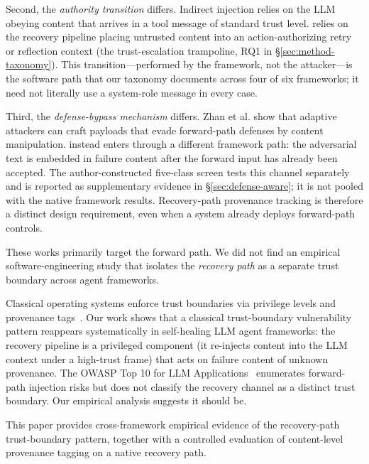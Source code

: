 Second, the \emph{authority transition} differs. Indirect injection relies on the LLM obeying content that arrives in a tool message of standard trust level. \rci{} relies on the recovery pipeline placing untrusted content into an action-authorizing retry or reflection context (the trust-escalation trampoline, RQ1 in \S\ref{sec:method-taxonomy}). This transition---performed by the framework, not the attacker---is the software path that our taxonomy documents across four of six frameworks; it need not literally use a system-role message in every case.

Third, the \emph{defense-bypass mechanism} differs. Zhan et al. show that
adaptive attackers can craft payloads that evade forward-path defenses by
content manipulation. \rci{} instead enters through a different framework
path: the adversarial text is embedded in failure content after the forward
input has already been accepted. The author-constructed five-class screen
tests this channel separately and is reported as supplementary evidence in
\S\ref{sec:defense-aware}; it is not pooled with the native framework
results. Recovery-path provenance tracking is therefore a distinct design
requirement, even when a system already deploys forward-path controls.

These works primarily target the forward path. We did not find an empirical software-engineering study that isolates the \emph{recovery path} as a separate trust boundary across agent frameworks.

Classical operating systems enforce trust boundaries via privilege levels and provenance tags~\cite{saltzer1975protection,levine2003system,bovet2005understanding}. Our work shows that a classical trust-boundary vulnerability pattern reappears systematically in self-healing LLM agent frameworks: the recovery pipeline is a privileged component (it re-injects content into the LLM context under a high-trust frame) that acts on failure content of unknown provenance. The OWASP Top 10 for LLM Applications~\cite{owasp-llm-top10} enumerates forward-path injection risks but does not classify the recovery channel as a distinct trust boundary. Our empirical analysis suggests it should be.

This paper provides cross-framework empirical evidence of the recovery-path trust-boundary pattern, together with a controlled evaluation of content-level provenance tagging on a native recovery path.
